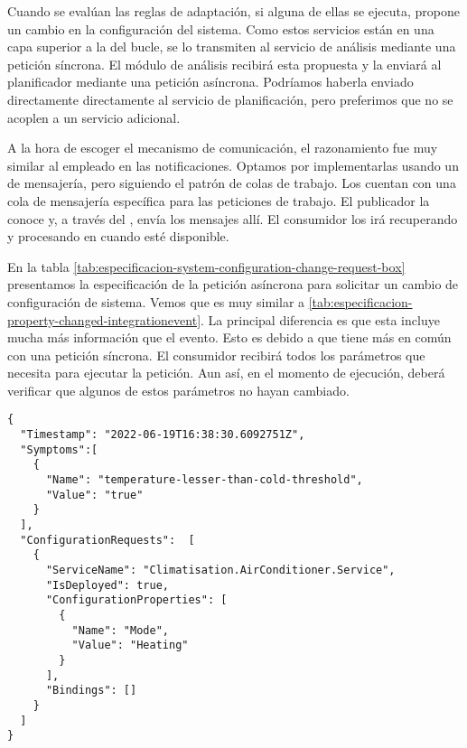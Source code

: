 Cuando se evalúan las reglas de adaptación, si alguna de ellas se ejecuta, propone un cambio en la configuración del sistema. Como estos servicios están en una capa superior a la del bucle, se lo transmiten al servicio de análisis mediante una petición síncrona. El módulo de análisis recibirá esta propuesta y la enviará al planificador mediante una petición asíncrona. Podríamos haberla enviado directamente directamente al servicio de planificación, pero preferimos que no se acoplen a un servicio adicional.

A la hora de escoger el mecanismo de comunicación, el razonamiento fue muy similar al empleado en las notificaciones. Optamos por implementarlas usando un  de mensajería, pero siguiendo el patrón de colas de trabajo. Los  cuentan con una cola de mensajería específica para las peticiones de trabajo. El publicador la conoce y, a través del  , envía los mensajes allí. El consumidor los irá recuperando y procesando en cuando esté disponible.

En la tabla \ref{tab:especificacion-system-configuration-change-request-box} presentamos la especificación de la petición asíncrona para solicitar un cambio de configuración de sistema. Vemos que es muy similar a \ref{tab:especificacion-property-changed-integrationevent}. La principal diferencia es que esta incluye mucha más información que el evento. Esto es debido a que tiene más en común con una petición síncrona. El consumidor recibirá todos los parámetros que necesita para ejecutar la petición. Aun así, en el momento de ejecución, deberá verificar que algunos de estos parámetros no hayan cambiado.

\newsavebox\systemconfigurationchangerequestbox
\begin{lrbox}{\systemconfigurationchangerequestbox}
  \begin{minipage}[t]{2in}
    \begin{verbatim}
{
  "Timestamp": "2022-06-19T16:38:30.6092751Z",
  "Symptoms":[
    {
      "Name": "temperature-lesser-than-cold-threshold",
      "Value": "true"
    }
  ],
  "ConfigurationRequests":  [
    {
      "ServiceName": "Climatisation.AirConditioner.Service",
      "IsDeployed": true,
      "ConfigurationProperties": [
        {
          "Name": "Mode",
          "Value": "Heating"
        }
      ],
      "Bindings": []
    }
  ]
}
        \end{verbatim}
  \end{minipage}
\end{lrbox}

